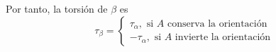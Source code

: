\begin{sol}[35]
  Por tanto, la torsión de $\beta$ es
  \[ 
    \tau_{\beta} =
    \begin{cases}
      \tau_{\alpha}, \text{ si $A$ conserva la orientación} \\
      -\tau_{\alpha}, \text{ si $A$ invierte la orientación}
    \end{cases}
  \] 
\end{sol}
